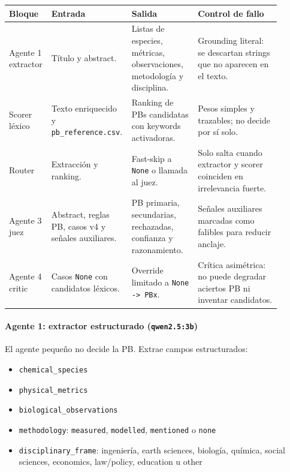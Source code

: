 \begin{center}
\scriptsize
\setlength{\tabcolsep}{4pt}
\renewcommand{\arraystretch}{1.18}
\begin{tabular}{p{0.14\linewidth}p{0.22\linewidth}p{0.24\linewidth}p{0.30\linewidth}}
\toprule
Bloque & Entrada & Salida & Control de fallo \\
\midrule
Agente 1 extractor & Título y abstract. & Listas de especies, métricas, observaciones, metodología y disciplina. & Grounding literal: se descartan strings que no aparecen en el texto. \\
Scorer léxico & Texto enriquecido y \texttt{pb\_reference.csv}. & Ranking de PBs candidatas con keywords activadoras. & Pesos simples y trazables; no decide por sí solo. \\
Router & Extracción y ranking. & Fast-skip a \texttt{None} o llamada al juez. & Solo salta cuando extractor y scorer coinciden en irrelevancia fuerte. \\
Agente 3 juez & Abstract, reglas PB, casos v4 y señales auxiliares. & PB primaria, secundarias, rechazadas, confianza y razonamiento. & Señales auxiliares marcadas como falibles para reducir anclaje. \\
Agente 4 critic & Casos \texttt{None} con candidatos léxicos. & Override limitado a \texttt{None -> PBx}. & Crítica asimétrica: no puede degradar aciertos PB ni inventar candidatos. \\
\bottomrule
\end{tabular}
\end{center}

\paragraph*{Agente 1: extractor estructurado (\texttt{qwen2.5:3b})}

El agente pequeño no decide la PB. Extrae campos estructurados:

\begin{itemize}
\item \texttt{chemical\_species}
\item \texttt{physical\_metrics}
\item \texttt{biological\_observations}
\item \texttt{methodology}: \texttt{measured}, \texttt{modelled}, \texttt{mentioned} o \texttt{none}
\item \texttt{disciplinary\_frame}: ingeniería, earth sciences, biología, química, social sciences, economics, law/policy, education u other
\end{itemize}

